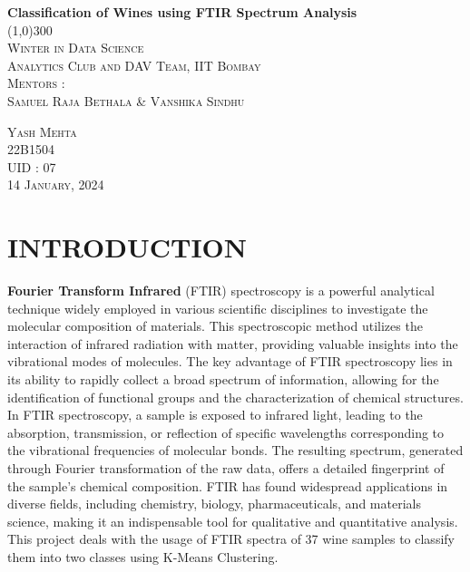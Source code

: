 \documentclass{article}
\begin{document}
\begin{titlepage}
	\begin{center}
	\huge{\bfseries Classification of Wines using FTIR Spectrum Analysis}\\
	\line(1,0){300}\\
	[0.1in]
	\textsc{\LARGE Winter in Data Science} \\
	\textsc{\large Analytics Club and DAV Team, IIT Bombay}\\
	[3cm]
	\textsc{\Large 
	Mentors :\\ 
	[-0.3cm]
	Samuel Raja Bethala \& Vanshika Sindhu}\\
	[8 cm]
	\end{center}
	\begin{flushright}
	\textsc{\Large Yash Mehta}\\
	\textsc{\large
	22B1504\\
	UID : 07\\
	14 January, 2024}\\
	\end{flushright}	
\end{titlepage}
\tableofcontents
\thispagestyle{empty}
\cleardoublepage
\setcounter{page}{1}



\section{INTRODUCTION}\label{sec:intro}
\textbf{Fourier Transform Infrared} (FTIR) spectroscopy is a powerful analytical technique widely employed in various scientific disciplines to investigate the molecular composition of materials. This spectroscopic method utilizes the interaction of infrared radiation with matter, providing valuable insights into the vibrational modes of molecules. The key advantage of FTIR spectroscopy lies in its ability to rapidly collect a broad spectrum of information, allowing for the identification of functional groups and the characterization of chemical structures.\\
\newline
In FTIR spectroscopy, a sample is exposed to infrared light, leading to the absorption, transmission, or reflection of specific wavelengths corresponding to the vibrational frequencies of molecular bonds. The resulting spectrum, generated through Fourier transformation of the raw data, offers a detailed fingerprint of the sample's chemical composition. FTIR has found widespread applications in diverse fields, including chemistry, biology, pharmaceuticals, and materials science, making it an indispensable tool for qualitative and quantitative analysis.\\ 
\newline
This project deals with the usage of FTIR spectra of 37 wine samples to classify them into two classes using K-Means Clustering.\\ 
[2cm]
\end{document}
